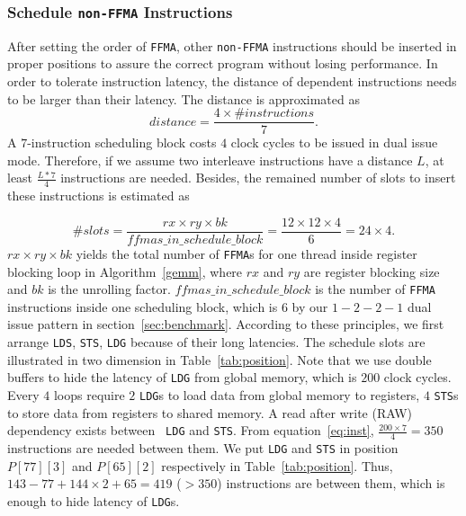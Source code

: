 \subsubsection{Schedule {\tt non-FFMA} Instructions}

After setting the order of {\tt FFMA}, other {\tt non-FFMA} instructions should be inserted in proper positions to
assure the correct program without losing performance. In order to tolerate instruction latency, the
distance of dependent instructions needs to be larger than their latency. The distance is approximated as
\begin{equation}
\label{eq:inst}
distance = \frac{4\times\#instructions}{7}.
\end{equation}
A $7$-instruction scheduling block costs $4$ clock cycles to be issued in dual issue mode.
Therefore, if we assume two interleave instructions have a distance $L$, at least $\frac{L*7}{4}$ instructions are needed.
Besides, the remained number of slots
to insert these instructions is estimated as

\begin{displaymath}
\#slots = \frac{rx\times ry\times bk}{ffmas\_in\_schedule\_block}=\frac{12\times 12\times 4}{6}=24\times 4.
\end{displaymath}
$rx\times ry\times bk$ yields the total number of {\tt FFMA}s for one thread inside register blocking loop in Algorithm~\ref{gemm}, where $rx$ and $ry$ are register blocking size and $bk$ is the unrolling factor.
$ffmas\_in\_schedule\_block$ is the number of {\tt FFMA} instructions inside one scheduling block, which is $6$ by our $1-2-2-1$ dual issue pattern in section~\ref{sec:benchmark}.
According to these principles, we first arrange {\tt LDS}, {\tt STS}, {\tt LDG} because of their long latencies. The
schedule slots are illustrated in two dimension in Table~\ref{tab:position}.
Note that we use double buffers to hide the latency of {\tt LDG} from global memory, which is $200$ clock cycles.
Every $4$ loops require $2$ {\tt LDG}s to load data from global memory to registers, $4$ {\tt STS}s to store data from
registers to shared memory. A read after write (RAW) dependency exists between {\tt
LDG} and {\tt STS}.
From equation~\ref{eq:inst}, $\frac{200\times 7}{4} = 350$ instructions are needed between them.
We put {\tt LDG} and  {\tt STS} in position $P[77][3]$ and $P[65][2]$ respectively in Table~\ref{tab:position}.
Thus, $143-77 + 144\times 2 + 65=419$ ($>350$) instructions are between them, which is enough to hide latency of {\tt LDG}s.

